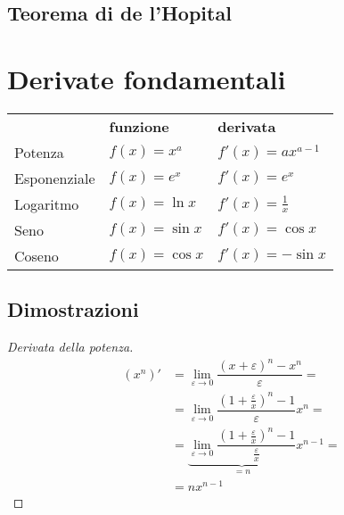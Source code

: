 \subsection{Teorema di de l'Hopital}
\begin{theorem}\label{thm:hopital}
\end{theorem}

\section{Derivate fondamentali}
\begin{center}
    \begin{tabular}{lll}
        & \textbf{funzione} & \textbf{derivata} \\
        Potenza      & $f(x) = x^a$       & $f'(x) = a x^{a-1}$    \\
        Esponenziale & $f(x) = e^x$       & $f'(x) = e^x$          \\
        Logaritmo    & $f(x) = \ln x$     & $f'(x) = \frac{1}{x}$  \\
        Seno         & $f(x) = \sin x$    & $f'(x) = \cos x$       \\
        Coseno       & $f(x) = \cos x$    & $f'(x) =-\sin x$       \\
    \end{tabular}
\end{center}
\subsection{Dimostrazioni}
\begin{proof}[Derivata della potenza]
\begin{equation}
    \begin{aligned}
    (x^n)'
        & = \lim_{\varepsilon \rightarrow 0 } \dfrac{(x+\varepsilon)^n - x^n}{\varepsilon} = \\
        & = \lim_{\varepsilon \rightarrow 0 } \dfrac{ \left( 1 + \frac{\varepsilon}{x} \right)^n - 1 }{\varepsilon} x^n = \\
        & = \underbrace{\lim_{\varepsilon \rightarrow 0 } \dfrac{ \left( 1 + \frac{\varepsilon}{x} \right)^n - 1 }{\frac{\varepsilon}{x}}}_{=n} x^{n-1} = \\
        & = n x^{n-1}
    \end{aligned}
\end{equation}
\end{proof}


